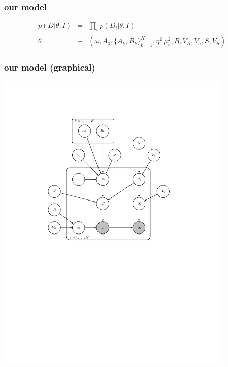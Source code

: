 \documentclass[pdftex]{beamer}
\begin{document}
\begin{frame}
  \frametitle{our model}
\begin{eqnarray}\displaystyle
p(D|\theta,I) &=& \prod_i p(D_i|\theta,I)
\nonumber \\
\theta &\equiv& (\omega, A_0, \{A_k, B_k\}_{k=1}^K, \eta^2\,\mu_i^2, B, V_B, V_{\sigma}, S, V_S)
\nonumber
\end{eqnarray}
\end{frame}

\begin{frame}
  \frametitle{our model (graphical)}
  \includegraphics[trim=3cm 12cm 5cm 3cm, clip=true, width=0.85\textwidth]{../tex/gm/gm.pdf}
\end{frame}
\end{document}
